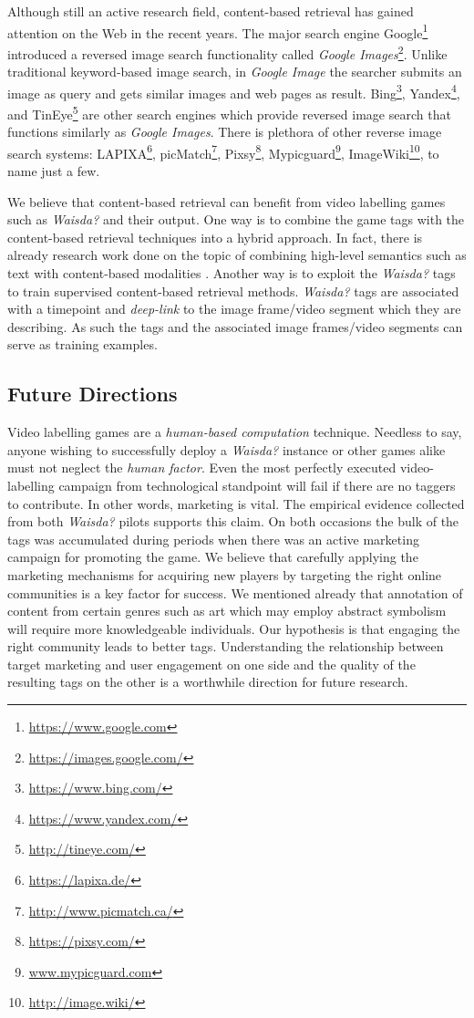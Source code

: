 Although still an active research field, content-based retrieval has gained attention on the Web in the recent years. The major search engine Google\footnote{\url{https://www.google.com}} introduced a reversed image search functionality called \textit{Google Images}\footnote{\url{https://images.google.com/}}. Unlike traditional keyword-based image search, in \textit{Google Image} the searcher submits an image as query and gets similar images and web pages as result. Bing\footnote{\url{https://www.bing.com/}}, Yandex\footnote{\url{https://www.yandex.com/}}, and TinEye\footnote{\url{http://tineye.com/}} are other search engines which provide reversed image search that functions similarly as \textit{Google Images}. There is plethora of other reverse image search systems: LAPIXA\footnote{\url{https://lapixa.de/}}, picMatch\footnote{\url{http://www.picmatch.ca/}}, Pixsy\footnote{\url{https://pixsy.com/}}, Mypicguard\footnote{\url{www.mypicguard.com}}, ImageWiki\footnote{\url{http://image.wiki/}}, to name just a few.

We believe that content-based retrieval can benefit from video labelling games such as \textit{Waisda?} and their output. One way is to combine the game tags with the content-based retrieval techniques into a hybrid approach. In fact, there is already research work done on the topic of combining high-level semantics such as text with content-based modalities \cite{Popescu:2007:ODC:1282280.1282338,Yavlinsky06alarge,citeulike:4000618,Huurnink:2010:TTR:1816041.1816045,snoek2007adding}.
Another way is to exploit the \textit{Waisda?} tags to train supervised content-based retrieval methods. \textit{Waisda?} tags are associated with a timepoint and \textit{deep-link} to the image frame/video segment which they are describing. As such the tags and the associated image frames/video segments can serve as training examples.

\subsection{Future Directions}
Video labelling games are a \textit{human-based computation} technique. Needless to say, anyone wishing to successfully deploy a \textit{Waisda?} instance or other games alike must not neglect the \textit{human factor}. Even the most perfectly executed video-labelling campaign from technological standpoint will fail if there are no taggers to contribute. In other words, marketing is vital. The empirical evidence collected from both \textit{Waisda?} pilots supports this claim. On both occasions the bulk of the tags was accumulated during periods when there was an active marketing campaign for promoting the game. We believe that carefully applying the marketing mechanisms for acquiring new players by targeting the right online communities is a key factor for success. We mentioned already that annotation of content from certain genres such as art which may employ abstract symbolism will require more knowledgeable individuals. Our hypothesis is that engaging the right community leads to better tags. Understanding the relationship between target marketing and user engagement on one side and the quality of the resulting tags on the other is a worthwhile direction for future research.


